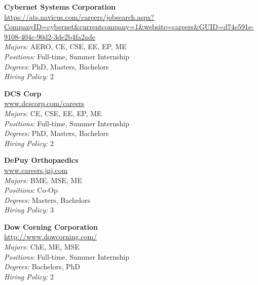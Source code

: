 \documentclass[twoside]{article}
\begin{document}
\begin{center}
\begin{multicols}{3}
\begin{minipage}{.9\columnwidth}{\Large\bf Cybernet Systems Corporation }\\
	\url{https://ats.navicus.com/careers/jobsearch.aspx?CompanyID=cybernet&currentcompany=1&website=careers&GUID=d74e591e-9108-404c-90d2-3de2b4fa2ade}\\
	\emph{Majors:} AERO, CE, CSE, EE, EP, ME\\
	\emph{Positions:} Full-time, Summer Internship\\
	\emph{Degrees:} PhD, Masters, Bachelors\\
	\emph{Hiring Policy:} 2\\
\end{minipage}
 
\begin{minipage}{.9\columnwidth}{\Large\bf DCS Corp }\\
	\url{www.dcscorp.com/careers}\\
	\emph{Majors:} CE, CSE, EE, EP, ME\\
	\emph{Positions:} Full-time, Summer Internship\\
	\emph{Degrees:} PhD, Masters, Bachelors\\
	\emph{Hiring Policy:} 2\\
\end{minipage}
 
\begin{minipage}{.9\columnwidth}{\Large\bf DePuy Orthopaedics }\\
	\url{www.careers.jnj.com}\\
	\emph{Majors:} BME, MSE, ME\\
	\emph{Positions:} Co-Op\\
	\emph{Degrees:} Masters, Bachelors\\
	\emph{Hiring Policy:} 3\\
\end{minipage}
 
\begin{minipage}{.9\columnwidth}{\Large\bf Dow Corning Corporation }\\
	\url{http://www.dowcorning.com/}\\
	\emph{Majors:} ChE, ME, MSE\\
	\emph{Positions:} Full-time, Summer Internship\\
	\emph{Degrees:} Bachelors, PhD\\
	\emph{Hiring Policy:} 2\\
\end{minipage}
 

\end{multicols}
\end{center}
\end{document}
